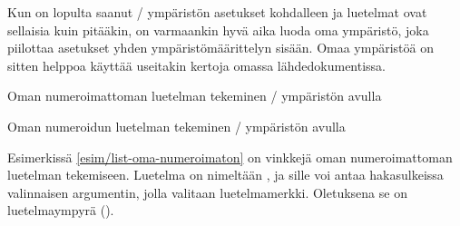 \noindent
Kun on lopulta saanut \-/ ympäristön asetukset
kohdalleen ja luetelmat ovat sellaisia kuin pitääkin, on varmaankin hyvä
aika luoda oma ympäristö, joka piilottaa asetukset yhden
ympäristömäärittelyn sisään. Omaa ympäristöä on sitten helppoa käyttää
useitakin kertoja omassa lähdedokumentissa.

\begin{esimerkki*}

\begin{koodilohko}
\newenvironment{numeroimaton}[1][\textbullet]{%
  \begin{list}{#1}{
      \setlength{\leftmargin}{1.1em}
      \setlength{\labelsep}{.2em}
      \setlength{\itemsep}{.4ex plus .1ex}
      \setlength{\parsep}{.2ex}
    }
  }{\end{list}}
\end{koodilohko}
  \caption{Oman numeroimattoman luetelman tekeminen \-/
    ympäristön avulla}
  \label{esim/list-oma-numeroimaton}
\end{esimerkki*}

\begin{esimerkki*}

\begin{koodilohko}
\newenvironment{numeroitu}[1][0]{%
  \begin{list}{\arabic{enumi}.}{
      \usecounter{enumi}
      \setcounter{enumi}{#1}
      \renewcommand{\makelabel}[1]{\hfill\bfseries\large ##1}
      \setlength{\leftmargin}{2em}
      \setlength{\labelsep}{.5em}
      \setlength{\itemsep}{.4ex plus .1ex}
      \setlength{\parsep}{.2ex}
    }
  }{\end{list}}
\end{koodilohko}
  \caption{Oman numeroidun luetelman tekeminen \-/
    ympäristön avulla}
  \label{esim/list-oma-numeroitu}
\end{esimerkki*}

Esimerkissä \ref{esim/list-oma-numeroimaton} on vinkkejä oman
numeroimattoman luetelman tekemiseen. Luetelma on nimeltään
, ja sille voi antaa hakasulkeissa valinnaisen
argumentin, jolla valitaan luetelmamerkki. Oletuksena se on
luetelmaympyrä ().

